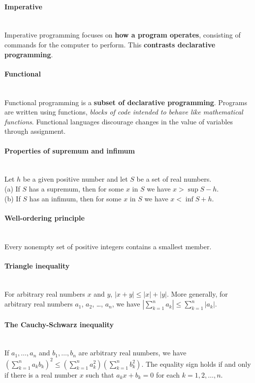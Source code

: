 \documentclass[10pt]{article}
\begin{document}
\paragraph{Imperative}\ \\
Imperative programming focuses on {\bf how a program operates}, consisting of commands for the computer to perform. This {\bf contrasts declarative programming}.

\paragraph{Functional}\ \\
Functional programming is a {\bf subset of declarative programming}. Programs are written using functions, {\it blocks of code intended to behave like mathematical functions}. Functional languages discourage changes in the value of variables through assignment.   

\noindent\makebox[\linewidth]{\rule{\paperwidth}{0.4pt}}


\paragraph{Properties of supremum and infimum}\ \\
Let $h$ be a given positive number and let $S$ be a set of real numbers.\\ 
(a) If $S$ has a supremum, then for some $x$ in $S$ we have $x > \sup S - h$.\\
(b) If $S$ has an infimum, then for some $x$ in $S$ we have $x < \inf S + h$.

\paragraph{Well-ordering principle}\ \\
Every nonempty set of positive integers contains a smallest member.

\paragraph{Triangle inequality}\ \\
For arbitrary real numbers $x$ and $y$, 
$|x + y| \leq |x| + |y|.$
More generally, for arbitrary real numbers $a_1$, $a_2$, \ldots, $a_n$, we have
$\left|\sum_{k=1}^n a_k\right| \leq \sum_{k=1}^n |a_k|.$

\paragraph{The Cauchy-Schwarz inequality}\ \\
If $a_1, \ldots, a_n$ and $b_1, \ldots, b_n$ are arbitrary real numbers, we have
$\left( \sum_{k=1}^n a_k b_k \right)^2 \leq \left( \sum_{k=1}^n a_k^2 \right) \left( \sum_{k=1}^n b_k^2 \right)$.
The equality sign holds if and only if there is a real number $x$ such that $a_k x + b_k = 0$
for each $k = 1, 2, \ldots, n$.
\end{document}
